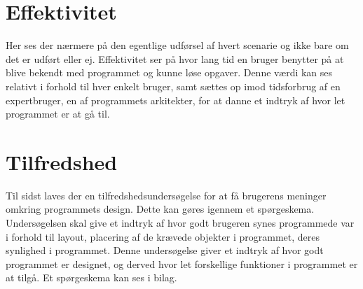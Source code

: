 \section{Effektivitet}
Her ses der nærmere på den egentlige udførsel af hvert scenarie og ikke bare om det er udført eller ej. Effektivitet ser på hvor lang tid en bruger benytter på at blive bekendt med programmet og kunne løse opgaver. Denne værdi kan ses relativt i forhold til hver enkelt bruger, samt sættes op imod tidsforbrug af en expertbruger, en af programmets arkitekter, for at danne et indtryk af hvor let programmet er at gå til.
\section{Tilfredshed}
Til sidst laves der en tilfredshedsundersøgelse for at få brugerens meninger omkring programmets design. Dette kan gøres igennem et spørgeskema. Undersøgelsen skal give et indtryk af hvor godt brugeren synes programmede var i forhold til layout, placering af de krævede objekter i programmet, deres synlighed i programmet. Denne undersøgelse giver et indtryk af hvor godt programmet er designet, og derved hvor let forskellige funktioner i programmet er at tilgå. Et spørgeskema kan ses i bilag. 

\cbend
